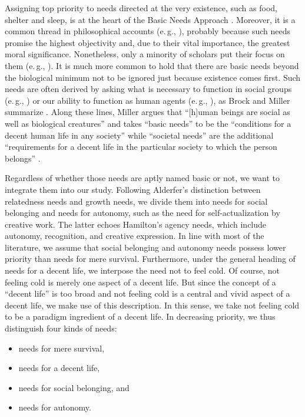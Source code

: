 \documentclass[10pt,letterpaper]{article}
\begin{document}
Assigning top priority to needs directed at the very existence, such as food, shelter and sleep, is at the heart of the Basic Needs Approach \cite{jolly_world_1976,ghai_basic_1978}.
Moreover, it is a common thread in philosophical accounts (e.\,g., \cite{braybrooke_meeting_1987,wiggins_needs_1987,wiggins_what_1998}), probably because such needs promise the highest objectivity and, due to their vital importance, the greatest moral significance.
Nonetheless, only a minority of scholars put their focus on them (e.\,g., \cite{daniels_just_1985}).
It is much more common to hold that there are basic needs beyond the biological minimum not to be ignored just because existence comes first.
Such needs are often derived by asking what is necessary to function in social groups (e.\,g., \cite{braybrooke_meeting_1987,thomson_need_1987,wiggins_what_1998}) or our ability to function as human agents (e.\,g., \cite{copp_equality_1998,gewirth_reason_1978,oneill_rights_1998,shue_basic_1996}), as Brock and Miller summarize \cite{brock_needs_2019}.
Along these lines, Miller argues that ``[h]uman beings are social as well as biological creatures'' and takes ``basic needs'' to be the ``conditions for a decent human life in any society'' while ``societal needs'' are the additional ``requirements for a decent life in the particular society to which the person belongs'' \cite[3]{miller_national_2007}.

Regardless of whether those needs are aptly named basic or not, we want to integrate them into our study.
Following Alderfer's distinction between relatedness needs and growth needs, we divide them into needs for social belonging and needs for autonomy, such as the need for self-actualization by creative work.
The latter echoes Hamilton's agency needs, which include autonomy, recognition, and creative expression.
In line with most of the literature, we assume that social belonging and autonomy needs possess lower priority than needs for mere survival.
Furthermore, under the general heading of needs for a decent life, we interpose the need not to feel cold.
Of course, not feeling cold is merely one aspect of a decent life.
But since the concept of a ``decent life'' is too broad and not feeling cold is a central and vivid aspect of a decent life, we make use of this description.
In this sense, we take not feeling cold to be a paradigm ingredient of a decent life.
In decreasing priority, we thus distinguish four kinds of needs:

\begin{itemize}
   \item needs for mere survival,
   \item needs for a decent life,
   \item needs for social belonging, and
   \item needs for autonomy.
\end{itemize}
\end{document}
